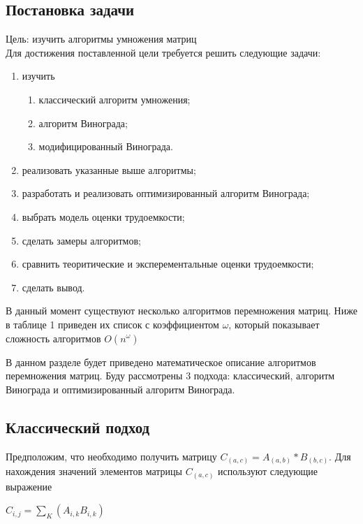 \documentclass[a4paper, 14pt]{article}
\begin{document}
	\subsection{Постановка задачи}
	
	Цель: изучить алгоритмы умножения матриц \\
	
	Для достижения поставленной цели требуется решить следующие задачи: 
	
	\begin{enumerate}
		\item изучить
		\begin{enumerate}
			\item классический алгоритм умножения;
			\item алгоритм Винограда;
			\item модифицированный Винограда.
		\end{enumerate}
		\item реализовать указанные выше алгоритмы;
		\item разработать и реализовать оптимизированный алгоритм Винограда;
		\item выбрать модель оценки трудоемкости;
		\item сделать замеры алгоритмов;
		\item сравнить теоритические и эксперементальные оценки трудоемкости;
		\item сделать вывод.
	\end{enumerate}
	
	В данный момент существуют несколько алгоритмов перемножения матриц. Ниже в таблице 1 приведен их список с коэффициентом $\omega$, который показывает сложность алгоритмов $O(n^\omega)$
		
	В данном разделе будет приведено математическое описание алгоритмов перемножения матриц. Буду рассмотрены 3 подхода: классический, алгоритм Винограда и оптимизированный алгоритм Винограда.
	
	\subsection{Классический подход}
	
	Предположим, что необходимо получить матрицу $C_{(a,c)} = A_{(a,b)} * B_{(b,c)}$. Для нахождения значений элементов матрицы $C_{(a,c)}$ используют следующие выражение
	
	\begin{center}
		\begin{math}
		C_{i,j} = \sum_{K}(A_{i, k}B_{i,k})
		\end{math}
	\end{center}
		
\end{document}
